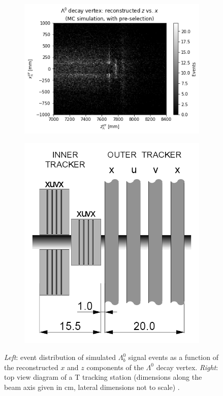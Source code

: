 \begin{figure}[t]
	\centering
	\begin{subfigure}{.45\textwidth}
		\includegraphics[width=\textwidth]{graphics/04-event_selection/Lambda_endvertex_z_vs_x.png}
		\caption{}
	\end{subfigure}
	\begin{subfigure}{.45\textwidth}
		\includegraphics[width=\textwidth]{graphics/04-event_selection/t_station_top_view.png}
		\caption{}
	\end{subfigure}
	\caption[A and b.]{\textit{Left}: event distribution of simulated $\Lambda_b^0$ signal events as a function of the reconstructed $x$ and $z$ components of the $\Lambda^0$ decay vertex. \textit{Right}: top view diagram of a T tracking station (dimensions along the beam axis given in \si{\centi\meter}, lateral dimensions not to scale) \cite{Barbosa-Marinho:582793}.}
\end{figure}


